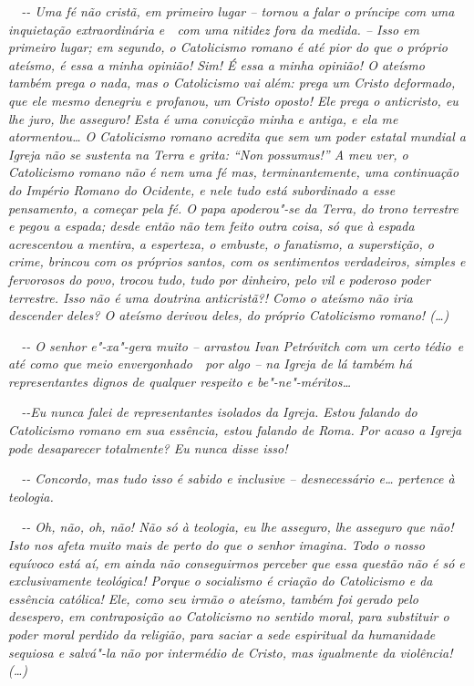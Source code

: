 \emph{~~-\/- Uma fé não cristã, em primeiro lugar -- tornou a falar o
príncipe com uma inquietação extraordinária e~~com uma nitidez fora da
medida. -- Isso em primeiro lugar; em segundo, o Catolicismo romano é
até pior do que o próprio ateísmo, é essa a minha opinião! Sim! É essa a
minha opinião! O ateísmo também prega o nada, mas o Catolicismo vai
além: prega um Cristo deformado, que ele mesmo denegriu e profanou, um
Cristo oposto! Ele prega o anticristo, eu lhe juro, lhe asseguro! Esta é
uma convicção minha e antiga, e ela me atormentou\ldots{} O Catolicismo romano
acredita que sem um poder estatal mundial a Igreja não se sustenta na
Terra e grita: ``Non possumus!'' A meu ver, o Catolicismo romano não é
nem uma fé mas, terminantemente, uma continuação do Império Romano do
Ocidente, e nele tudo está subordinado a esse pensamento, a começar pela
fé. O papa apoderou"-se da Terra, do trono terrestre e pegou a espada;
desde então não tem feito outra coisa, só que à espada acrescentou a
mentira, a esperteza, o embuste, o fanatismo, a superstição, o crime,
brincou com os próprios santos, com os sentimentos verdadeiros, simples
e fervorosos do povo, trocou tudo, tudo por dinheiro, pelo vil e
poderoso poder terrestre. Isso não é uma doutrina anticristã?! Como o
ateísmo não iria descender deles? O ateísmo derivou deles, do próprio
Catolicismo romano! (\ldots{})}

\emph{~~-\/- O senhor e"-xa"-gera muito -- arrastou Ivan Petróvitch com um
certo tédio~e até como que meio envergonhado~~por algo -- na Igreja de
lá também há representantes dignos de qualquer respeito e
be"-ne"-méritos\ldots{}}

\emph{~~-\/-Eu nunca falei de representantes isolados da Igreja. Estou
falando do Catolicismo romano em sua essência, estou falando de Roma.
Por acaso a Igreja pode desaparecer totalmente? Eu nunca disse isso!}

\emph{~~-\/- Concordo, mas tudo isso é sabido e inclusive --
desnecessário e\ldots{} pertence à teologia.}

\emph{~~-\/- Oh, não, oh, não! Não só à teologia, eu lhe asseguro, lhe
asseguro que não! Isto nos afeta muito mais de perto do que o senhor
imagina. Todo o nosso equívoco está aí, em ainda não conseguirmos
perceber que essa questão não é só e exclusivamente teológica! Porque o
socialismo é criação do Catolicismo e da essência católica! Ele, como
seu irmão o ateísmo, também foi gerado pelo desespero, em contraposição
ao Catolicismo no sentido moral, para substituir o poder moral perdido
da religião, para saciar a sede espiritual da humanidade sequiosa e
salvá"-la não por intermédio de Cristo, mas igualmente da violência!
(\ldots{})}

